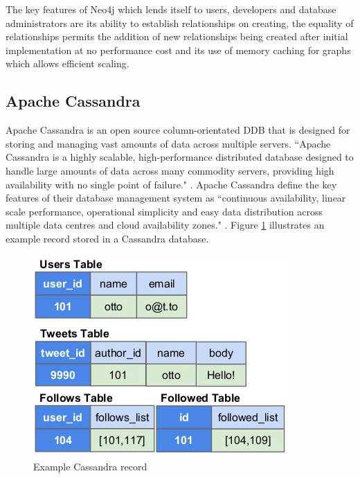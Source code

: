 The key features of Neo4j which lends itself to users, developers and database administrators are its ability to establish relationships on creating, the equality of relationships permits the addition of new relationships being created after initial implementation at no performance cost and its use of memory caching for graphs which allows efficient scaling.

\subsection{Apache Cassandra}\label{cassandra}
Apache Cassandra is an open source column-orientated DDB that is designed for storing and managing vast amounts of data across multiple servers. ``Apache Cassandra is a highly scalable, high-performance distributed database designed to handle large amounts of data across many commodity servers, providing high availability with no single point of failure." \cite{cassandra}. Apache Cassandra define the key features of their database management system as ``continuous availability, linear scale performance, operational simplicity and easy data distribution across multiple data centres and cloud availability zones." \cite{cassandra}.  Figure \ref{fig:cass} illustrates an example record stored in a Cassandra database. \begin{figure}[h]\begin{center}\includegraphics[width=0.70\linewidth]{images/cassandramodel}\caption{Example Cassandra record}\label{fig:cass}\end{center}\end{figure}

